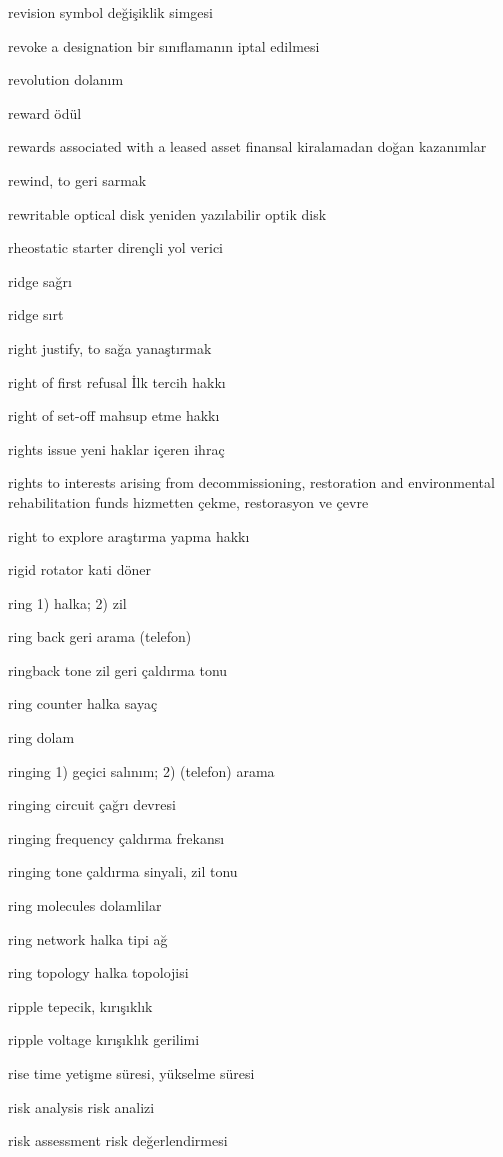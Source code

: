 \documentclass[12pt,fleqn]{article}\usepackage{../../common}
\begin{document}
revision symbol değişiklik simgesi

revoke a designation bir sınıflamanın iptal edilmesi

revolution dolanım

reward ödül

rewards associated with a leased asset finansal kiralamadan doğan kazanımlar

rewind, to geri sarmak

rewritable optical disk yeniden yazılabilir optik disk

rheostatic starter dirençli yol verici

ridge sağrı

ridge sırt

right justify, to sağa yanaştırmak

right of first refusal İlk tercih hakkı

right of set-off mahsup etme hakkı

rights issue yeni haklar içeren ihraç

rights to interests arising from decommissioning, restoration and environmental rehabilitation funds hizmetten çekme, restorasyon ve çevre

right to explore araştırma yapma hakkı

rigid rotator kati döner

ring 1) halka; 2) zil

ring back geri arama (telefon)

ringback tone zil geri çaldırma tonu

ring counter halka sayaç

ring dolam

ringing 1) geçici salınım; 2) (telefon) arama

ringing circuit çağrı devresi

ringing frequency çaldırma frekansı

ringing tone çaldırma sinyali, zil tonu

ring molecules dolamlilar

ring network halka tipi ağ

ring topology halka topolojisi

ripple tepecik, kırışıklık

ripple voltage kırışıklık gerilimi

rise time yetişme süresi, yükselme süresi

risk analysis risk analizi

risk assessment risk değerlendirmesi
\end{document}
